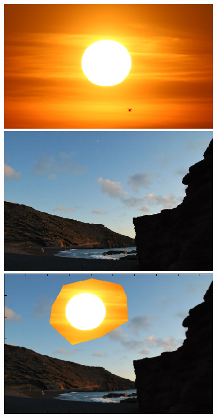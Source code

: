 \documentclass[11pt]{article}
\begin{document}
\begin{figure} [ht]
\begin{center}
\includegraphics[scale=0.12]{results_poisson/set5/im1.jpg}  
\includegraphics[scale=0.28]{results_poisson/set5/im2.jpg}
\includegraphics[scale=0.54]{results_poisson/set5/im4.png} 

\end{center}
\end{figure}
\end{document}
